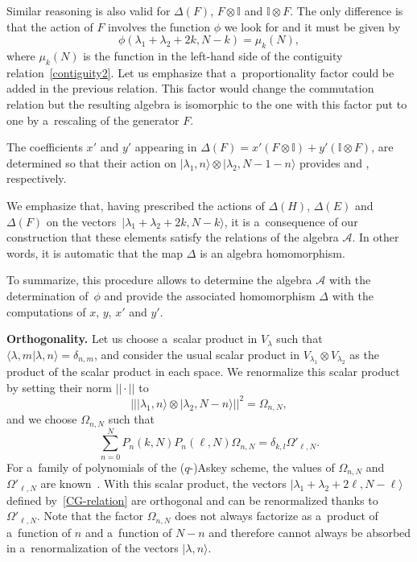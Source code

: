 \documentclass[10pt,a4paper]{amsart}
\numberwithin{equation}{section}
\theoremstyle{definition}
\begin{document}
Similar reasoning is also valid for $\Delta(F)$, $F\otimes \mathbb{I}$ and $\mathbb{I} \otimes F$. The only difference is that the action of $F$ involves the function $\phi$ we look for and it must be given by
\begin{equation}\label{eq:phimu}
 \phi(\lambda_1+\lambda_2+2k,N-k)=\mu_k(N),
\end{equation}
where $\mu_k(N)$ is the function in the left-hand side of the contiguity relation~\eqref{contiguity2}. Let us emphasize that a~proportionality factor could be added in the previous relation. This factor would change the commutation relation but the resulting algebra is isomorphic to the one with this factor put to one by a~rescaling of the generator $F$.

The coefficients $x'$ and $y'$ appearing in
$\Delta(F)=x'(F\otimes \mathbb{I})+y'(\mathbb{I}\otimes F)$,
are determined so that their action on $|\lambda_1,n\rangle\otimes |\lambda_2,N-1-n\rangle$ provides  and , respectively.

We emphasize that, having prescribed the actions of $\Delta(H)$, $\Delta(E)$ and $\Delta(F)$ on the vectors~${|\lambda_1+\lambda_2+2k,N-k\rangle}$, it is a~consequence of our construction that these elements satisfy the relations of the algebra $\mathcal{A}$. In other words, it is automatic that the map $\Delta$ is an algebra homomorphism.

To summarize, this procedure allows to determine the algebra $\mathcal{A}$ with the determination of~$\phi$ and provide the associated homomorphism $\Delta$ with the computations of $x$, $y$, $x'$ and $y'$.

{\bf Orthogonality.} Let us choose a~scalar product in $V_{\lambda}$ such that
$
 \langle \lambda,m|\lambda,n \rangle=\delta_{n,m}$,
and consider the usual scalar product in $V_{\lambda_1}\otimes V_{\lambda_2}$ as the product of the scalar product in each space. We renormalize this scalar product by setting their norm $||\cdot ||$ to
\[\big|\big| |\lambda_1,n\rangle\otimes |\lambda_2,N-n\rangle\big|\big|^2=\Omega_{n,N},\]
and we choose $\Omega_{n,N}$ such that
\[\sum_{n=0}^NP_n(k,N)P_n(\ell,N)\Omega_{n,N}=\delta_{k,l}\Omega'_{\ell,N} .\]
For a~family of polynomials of the ($q$-)Askey scheme, the values of $\Omega_{n,N}$ and $\Omega'_{\ell,N}$ are known~\cite{KLS10}. With this scalar product, the vectors $|\lambda_1+\lambda_2+2\ell,N-\ell \rangle$ defined by~\eqref{CG-relation} are orthogonal and can be renormalized thanks to $\Omega'_{\ell,N}$. Note that the factor $\Omega_{n,N}$ does not always factorize as a~product of a~function of $n$ and a~function of $N-n$ and therefore cannot always be absorbed in a~renormalization of the vectors $|\lambda,n\rangle$.
\end{document}
